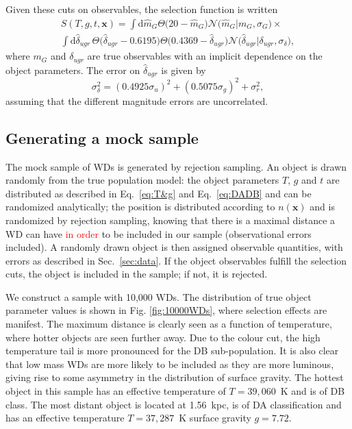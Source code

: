\documentclass[fleqn,usenatbib]{mnras}
\newcommand{\changes}[1]{\textcolor{red}{#1}}
\newcommand{\Teff}{T}
\newcommand{\logg}{g}
\newcommand{\de}{\text{d}}
\begin{document}
Given these cuts on observables, the selection function is written
\begin{equation}\label{eq:selection}
\begin{split}
	S(\Teff,\logg,t,\mathbf{x}) = 
    	      \int \de \hat{m}_G \Theta \big( 20-\hat{m}_G \big)\mathcal{N}\big( \hat{m}_G | m_G,\sigma_G \big) \times \\
    \int \de \hat{\delta}_{ugr}\,
    \Theta \big( \hat{\delta}_{ugr} -0.6195 \big)
    \Theta \big( 0.4369 - \hat{\delta}_{ugr} \big)
    \mathcal{N}\big( \hat{\delta}_{ugr} | \delta_{ugr},\sigma_{\delta}\big),
\end{split}
\end{equation}
where $m_G$ and $\delta_{ugr}$ are true observables with an implicit dependence on the object parameters. The error on $\hat{\delta}_{ugr}$ is given by
\begin{equation}
	\sigma_\delta^2 = (0.4925 \sigma_u)^2 + (0.5075 \sigma_g)^2 + \sigma_r^2,
\end{equation}
assuming that the different magnitude errors are uncorrelated.


\subsection{Generating a mock sample}

The mock sample of WDs is generated by rejection sampling. An object is drawn randomly from the true population model: the object parameters $\Teff$, $\logg$ and $t$ are distributed as described in Eq.~\eqref{eq:T&g} and Eq.~\eqref{eq:DADB} and can be randomized analytically; the position is distributed according to $n(\mathbf{x})$ and is randomized by rejection sampling, knowing that there is a maximal distance a WD can have \changes{in order} to be included in our sample (observational errors included). A randomly drawn object is then assigned observable quantities, with errors as described in Sec.~\ref{sec:data}. If the object observables fulfill the selection cuts, the object is included in the sample; if not, it is rejected.

We construct a sample with 10,000 WDs. The distribution of true object parameter values is shown in Fig. \ref{fig:10000WDs}, where selection effects are manifest. The maximum distance is clearly seen as a function of temperature, where hotter objects are seen further away. Due to the colour cut, the high temperature tail is more pronounced for the DB sub-population. It is also clear that low mass WDs are more likely to be included as they are more luminous, giving rise to some asymmetry in the distribution of surface gravity. The hottest object in this sample has an effective temperature of $\Teff=39,060$~K and is of DB class. The most distant object is located at 1.56~kpc, is of DA classification and has an effective temperature $\Teff=37,287$~K surface gravity $\logg=7.72$.
\end{document}
